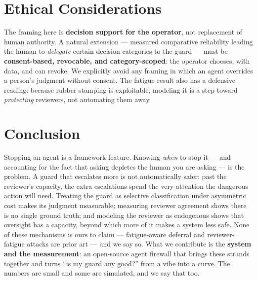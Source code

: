 \documentclass[11pt]{article}
\begin{document}
\section{Ethical Considerations}\label{sec:ethics}

The framing here is \textbf{decision support for the operator}, not replacement of human authority. A
natural extension --- measured comparative reliability leading the human to \emph{delegate} certain
decision categories to the guard --- must be \textbf{consent-based, revocable, and category-scoped}:
the operator chooses, with data, and can revoke. We explicitly avoid any framing in which an agent
overrides a person's judgment without consent. The fatigue result also has a defensive reading:
because rubber-stamping is exploitable, modeling it is a step toward \emph{protecting} reviewers, not
automating them away.

\section{Conclusion}

Stopping an agent is a framework feature. Knowing \emph{when} to stop it --- and accounting for the
fact that asking depletes the human you are asking --- is the problem. A guard that escalates more is
not automatically safer: past the reviewer's capacity, the extra escalations spend the very attention
the dangerous action will need. Treating the guard as selective
classification under asymmetric cost makes its judgment measurable; measuring reviewer agreement shows
there is no single ground truth; and modeling the reviewer as endogenous shows that oversight has a
capacity, beyond which more of it makes a system less safe. None of these mechanisms is ours to claim
--- fatigue-aware deferral and reviewer-fatigue attacks are prior art --- and we say so. What we
contribute is the \textbf{system and the measurement}: an open-source agent firewall that brings these
strands together and turns ``is my guard any good?'' from a vibe into a curve. The numbers are small
and some are simulated, and we say that too.
\end{document}
